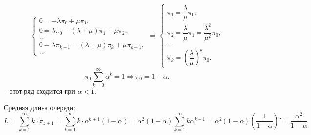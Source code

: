 \begin{ex}
\begin{figure}[h!]
  \end{figure}
  \[
    \begin{cases}
      0 = -\lambda \pi_0 + \mu \pi_1, \\
      0 = \lambda \pi_0 - (\lambda+\mu) \pi_1 + \mu \pi_2, \\
      \dots\\
      0 = \lambda \pi_{k-1} - (\lambda+\mu) \pi_k + \mu \pi_{k+1}, \\
      \dots
    \end{cases}
    \Rightarrow
    \begin{cases}
      \pi_1 = \dfrac{\lambda}{\mu} \pi_0, \\
      \pi_2 = \dfrac{\lambda}{\mu}\pi_1 = \dfrac{\lambda^2}{\mu^2} \pi_0, \\
      \dots \\
      \pi_k = \left( \dfrac{\lambda}{\mu} \right)^k \pi_0.
    \end{cases}
  \]
  \[
    \pi_0 \sum_{k=0}^\infty \alpha^k = 1 \Rightarrow \pi_0 = 1 - \alpha.
  \]
  -- этот ряд сходится при $\alpha < 1$.

  Средняя длина очереди:
  \[
    L = \sum_{k=1}^\infty k \cdot \pi_{k+1}
    = \sum_{k=1}^\infty k\cdot \alpha^{k+1} (1-\alpha)
    = \alpha^2 (1-\alpha) \sum_{k=1}^\infty k \alpha^{k+1}
     = \alpha^2 (1-\alpha) \left( \dfrac{1}{1-\alpha} \right)' = \dfrac{\alpha^2}{1-\alpha}
  \]
\end{ex}

